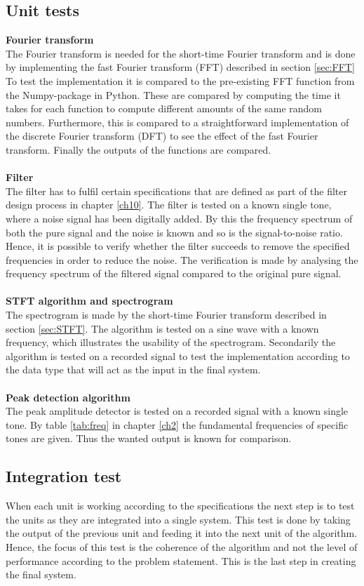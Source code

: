 \subsection{Unit tests} 
\textbf{Fourier transform} \\
The Fourier transform is needed for the short-time Fourier transform and is done by implementing the fast Fourier transform (FFT) described in section \ref{sec:FFT} 
To test the implementation it is compared to the pre-existing FFT function from the Numpy-package in Python. These are compared by computing the time it takes for each function to compute different amounts of the same random numbers. Furthermore, this is compared to a straightforward implementation of the discrete Fourier transform (DFT) to see the effect of the fast Fourier transform. Finally the outputs of the functions are compared.
\\
\\
\textbf{Filter}\\
The filter has to fulfil certain specifications that are defined as part of the filter design process in chapter \ref{ch10}. The filter is tested on a known single tone, where a noise signal has been digitally added. By this the frequency spectrum of both the pure signal and the noise is known and so is the signal-to-noise ratio. Hence, it is possible to verify whether the filter succeeds to remove the specified frequencies in order to reduce the noise. The verification is made by analysing the frequency spectrum of the filtered signal compared to the original pure signal. \\
\\
\textbf{STFT algorithm and spectrogram}\\
The spectrogram is made by the short-time Fourier transform described in section \ref{sec:STFT}. The algorithm is tested on a sine wave with a known frequency, which illustrates the usability of the spectrogram. Secondarily the algorithm is tested on a recorded signal to test the implementation according to the data type that will act as the input in the final system.
\\ \\
\textbf{Peak detection algorithm}\\
The peak amplitude detector is tested on a recorded signal with a known single tone. By table \ref{tab:freq} in chapter \ref{ch2} the fundamental frequencies of specific tones are given. Thus the wanted output is known for comparison.         

\subsection{Integration test}
When each unit is working according to the specifications the next step is to test the units as they are integrated into a single system. This test is done by taking the output of the previous unit and feeding it into the next unit of the algorithm. Hence, the focus of this test is the coherence of the algorithm and not the level of performance according to the problem statement. This is the last step in creating the final system.

